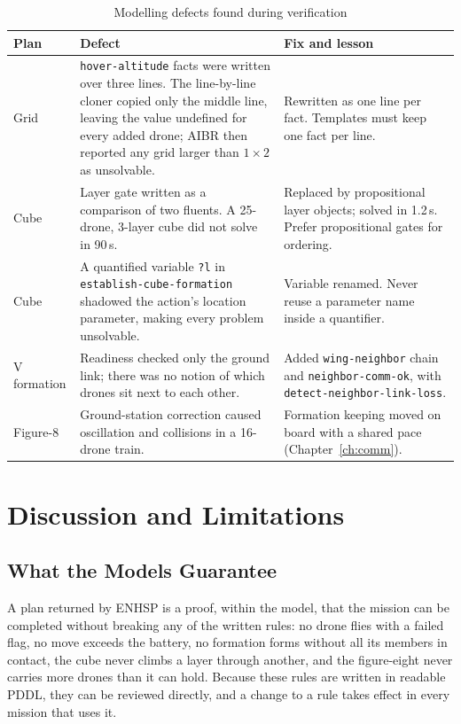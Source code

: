 \documentclass[11pt,a4paper,oneside]{report}
\newcommand{\code}[1]{\texttt{#1}}
\begin{document}
\begin{table}[H]
\caption{Modelling defects found during verification}\label{tab:defects}
\small
\begin{tabularx}{\textwidth}{@{}P{0.2\textwidth}P{0.36\textwidth}Y@{}}
\toprule
\textbf{Plan} & \textbf{Defect} & \textbf{Fix and lesson} \\
\midrule
Grid & \code{hover-altitude} facts were written over three lines. The line-by-line cloner copied
only the middle line, leaving the value undefined for every added drone; AIBR then reported any
grid larger than $1\times2$ as unsolvable. & Rewritten as one line per fact. Templates must keep
one fact per line. \\
Cube & Layer gate written as a comparison of two fluents. A 25-drone, 3-layer cube did not solve
in 90\,s. & Replaced by propositional layer objects; solved in 1.2\,s. Prefer propositional
gates for ordering. \\
Cube & A quantified variable \code{?l} in \code{establish-cube-formation} shadowed the action's
location parameter, making every problem unsolvable. & Variable renamed. Never reuse a parameter
name inside a quantifier. \\
V formation & Readiness checked only the ground link; there was no notion of which drones sit
next to each other. & Added \code{wing-neighbor} chain and \code{neighbor-comm-ok}, with
\code{detect-neighbor-link-loss}. \\
Figure-8 & Ground-station correction caused oscillation and collisions in a 16-drone train. &
Formation keeping moved on board with a shared pace (Chapter~\ref{ch:comm}). \\
\bottomrule
\end{tabularx}
\end{table}

\chapter{Discussion and Limitations}\label{ch:discussion}

\section{What the Models Guarantee}
A plan returned by ENHSP is a proof, within the model, that the mission can be completed without
breaking any of the written rules: no drone flies with a failed flag, no move exceeds the battery,
no formation forms without all its members in contact, the cube never climbs a layer through
another, and the figure-eight never carries more drones than it can hold. Because these rules are
written in readable PDDL, they can be reviewed directly, and a change to a rule takes effect in
every mission that uses it.
\end{document}
